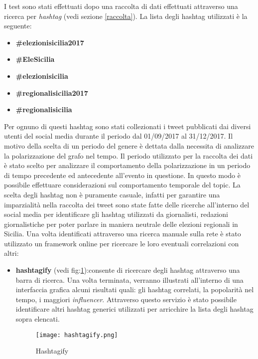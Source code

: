 I test sono stati effettuati dopo una raccolta di dati effettuati attraverso una ricerca per \textit{hashtag} (vedi sezione \ref{raccolta}). La lista degli hashtag utilizzati è la seguente:
\begin{itemize}
\item \textbf{\#elezionisicilia2017}
\item \textbf{\#EleSicilia}
\item \textbf{\#elezionisicilia}
\item \textbf{\#regionalisicilia2017}
\item \textbf{\#regionalisicilia}
\end{itemize}
Per ognuno di questi hashtag sono stati collezionati i tweet pubblicati dai diversi utenti del social media durante il periodo dal 01/09/2017 al 31/12/2017.
Il motivo della scelta di un periodo del genere è dettata dalla necessita di analizzare la polarizzazione del grafo nel tempo. Il periodo utilizzato per la raccolta dei dati è stato scelto per analizzare il comportamento della polarizzazione in un periodo di tempo precedente ed antecedente all'evento in questione. In questo modo è possibile effettuare considerazioni sul comportamento temporale del topic.
La scelta degli hashtag non è puramente casuale, infatti per garantire una imparzialità nella raccolta dei tweet sono state fatte delle ricerche all'interno del social media per identificare gli hashtag utilizzati da giornalisti, redazioni giornalistiche per poter parlare in maniera neutrale delle elezioni regionali in Sicilia.
Una volta identificati attraverso una ricerca manuale sulla rete è stato utilizzato un framework online per ricercare le loro eventuali correlazioni con altri:
\begin{itemize}
\item \textbf{hashtagify} (vedi fig:\ref{Hashtagify}):consente di ricercare degli hashtag attraverso una barra di ricerca. Una volta terminata, verranno illustrati all'interno di una interfaccia grafica alcuni risultati quali: gli hashtag correlati, la popolarità nel tempo, i maggiori \textit{influencer}.
Attraverso questo servizio è stato possibile identificare altri hashtag generici utilizzati per arricchire la lista degli hashtag sopra elencati.
\begin{figure}[!htb]
    \begin{center}
      \texttt{[image: hashtagify.png]}
	\caption{Hashtagify}
	\label{Hashtagify}
    \end{center}
  \end{figure}
  
\end{itemize}
